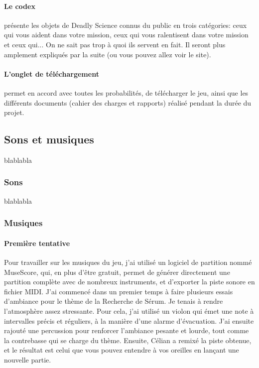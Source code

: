 \documentclass{article}
\begin{document}
\paragraph{Le codex}présente les objets de Deadly Science connus du public en trois catégories: ceux qui vous aident dans votre mission, ceux qui vous ralentisent dans votre mission et ceux qui... On ne sait pas trop à quoi ils servent en fait. Il seront plus amplement expliqués par la suite (ou vous pouvez allez voir le site).

\paragraph{L'onglet de téléchargement}permet en accord avec toutes les probabilités, de télécharger le jeu, ainsi que les différents documents (cahier des charges et rapports) réalisé pendant la durée du projet.

\subsection{Sons et musiques}
blablabla
\subsubsection{Sons}
blablabla
\subsubsection{Musiques}
\paragraph{Première tentative}
Pour travailler sur les musiques du jeu, j'ai utilisé un logiciel de partition nommé MuseScore, qui, en plus d'être gratuit, permet de générer directement une partition complète avec de nombreux instruments, et d'exporter la piste sonore en fichier MIDI. J'ai commencé dans un premier temps à faire plusieurs essais d'ambiance pour le thème de la Recherche de Sérum. Je tenais à rendre l'atmosphère assez stressante. Pour cela, j'ai utilisé un violon qui émet une note à intervalles précis et réguliers, à la manière d'une alarme d'évacuation. J'ai ensuite rajouté une percussion pour renforcer l'ambiance pesante et lourde, tout comme la contrebasse qui se charge du thème. Ensuite, Célian a remixé la piste obtenue, et le résultat est celui que vous pouvez entendre à vos oreilles en lançant une nouvelle partie.
\end{document}
